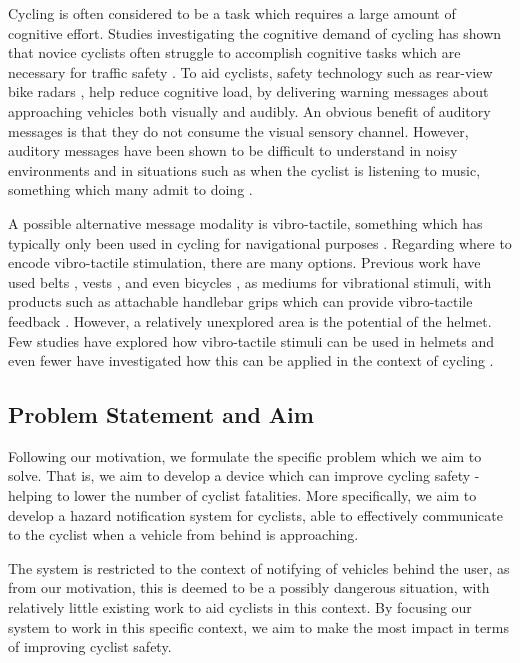 \documentclass{interim}
\begin{document}
Cycling is often considered to be a task which requires a large amount of cognitive effort. Studies investigating the cognitive demand of cycling has shown that novice cyclists often struggle to accomplish cognitive tasks which are necessary for traffic safety \cite{https://doi.org/10.1002/acp.2350050205}. To aid cyclists, safety technology such as rear-view bike radars \cite{garminradar}, help reduce cognitive load, by delivering warning messages about approaching vehicles both visually and audibly. An obvious benefit of auditory messages is that they do not consume the visual sensory channel. However, auditory messages have been shown to be difficult to understand in noisy environments \cite{noisyenv} and in situations such as when the cyclist is listening to music, something which many admit to doing \cite{DEWAARD2011626}.

A possible alternative message modality is vibro-tactile, something which has typically only been used in cycling for navigational purposes \cite{10.1145/2371574.2371631, 10.1145/1613858.1613911}. Regarding where to encode vibro-tactile stimulation, there are many options. Previous work have used belts \cite{10.1145/1613858.1613911, 10.1145/2449396.2449450, 10.1145/1060581.1060585}, vests \cite{729547, 998954, van2000tactile}, and even bicycles \cite{10.1145/2371574.2371631, 10.1145/3290605.3300850}, as mediums for vibrational stimuli, with products such as attachable handlebar grips which can provide vibro-tactile feedback \cite{smartgrips}. However, a relatively unexplored area is the potential of the helmet. Few studies have explored how vibro-tactile stimuli can be used in helmets \cite{10.1007/978-3-642-39802-5_3, yamauchi2020vibro} and even fewer have investigated how this can be applied in the context of cycling \cite{krauss2021head}.
 

\subsection{Problem Statement and Aim}
Following our motivation, we formulate the specific problem which we aim to solve. That is, we aim to develop a device which can improve cycling safety - helping to lower the number of cyclist fatalities. More specifically, we aim to develop a hazard notification system for cyclists, able to effectively communicate to the cyclist when a vehicle from behind is approaching. 

The system is restricted to the context of notifying of vehicles behind the user, as from our motivation, this is deemed to be a possibly dangerous situation, with relatively little existing work to aid cyclists in this context. By focusing our system to work in this specific context, we aim to make the most impact in terms of improving cyclist safety.
\end{document}
